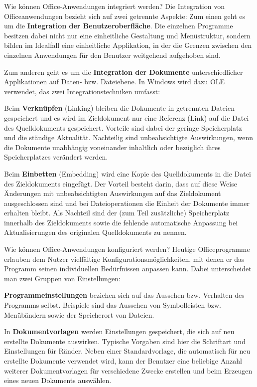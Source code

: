 \documentclass[a6paper,10pt,grid=front%
,toc
]{kartei}
\begin{document}
  \begin{karte}{Wie können Office-Anwendungen integriert werden?}  
    Die Integration von Officeanwendungen bezieht sich auf zwei getrennte Aspekte: Zum einen geht es um die \textbf{Integration der Benutzeroberfläche}. Die einzelnen Programme besitzen dabei nicht nur eine einheitliche Gestaltung und Menüstruktur, sondern bilden im Idealfall eine einheitliche Applikation, in der die Grenzen zwischen den einzelnen Anwendungen für den Benutzer weitgehend aufgehoben sind.

    Zum anderen geht es um die \textbf{Integration der Dokumente} unterschiedlicher Applikationen auf Daten- bzw. Dateiebene. In Windows wird dazu OLE verwendet, das zwei Integrationstechniken umfasst:

    Beim \textbf{Verknüpfen} (Linking) bleiben die Dokumente in getrennten Dateien gespeichert und es wird im Zieldokument nur eine Referenz (Link) auf die Datei des Quelldokuments gespeichert. Vorteile sind dabei der geringe Speicherplatz und die ständige Aktualität. Nachteilig sind unbeabsichtigte Auswirkungen, wenn die Dokumente unabhängig voneinander inhaltlich oder bezüglich ihres Speicherplatzes verändert werden.

    Beim \textbf{Einbetten} (Embedding) wird eine Kopie des Quelldokuments in die Datei des Zieldokuments eingefügt. Der Vorteil besteht darin, dass auf diese Weise Änderungen mit unbeabsichtigten Auswirkungen auf das Zieldokument ausgeschlossen sind und bei Dateioperationen die Einheit der Dokumente immer erhalten bleibt. Als Nachteil sind der (zum Teil zusätzliche) Speicherplatz innerhalb des Zieldokuments sowie die fehlende automatische Anpassung bei Aktualisierungen des originalen Quelldokuments zu nennen.
  \end{karte}

  \begin{karte}{Wie können Office-Anwendungen konfiguriert werden?}  
    Heutige Officeprogramme erlauben dem Nutzer vielfältige Konfigurationsmöglichkeiten, mit denen er das Programm seinen individuellen Bedürfnissen anpassen kann. Dabei unterscheidet man zwei Gruppen von Einstellungen:

    \textbf{Programmeinstellungen} beziehen sich auf das Aussehen bzw. Verhalten des Programms selbst. Beispiele sind das Aussehen von Symbolleisten bzw. Menübändern sowie der Speicherort von Dateien.

    In \textbf{Dokumentvorlagen} werden Einstellungen gespeichert, die sich auf neu erstellte Dokumente auswirken. Typische Vorgaben sind hier die Schriftart und Einstellungen für Ränder. Neben einer Standardvorlage, die automatisch für neu erstellte Dokumente verwendet wird, kann der Benutzer eine beliebige Anzahl weiterer Dokumentvorlagen für verschiedene Zwecke erstellen und beim Erzeugen eines neuen Dokuments auswählen.
  \end{karte}
\end{document}
